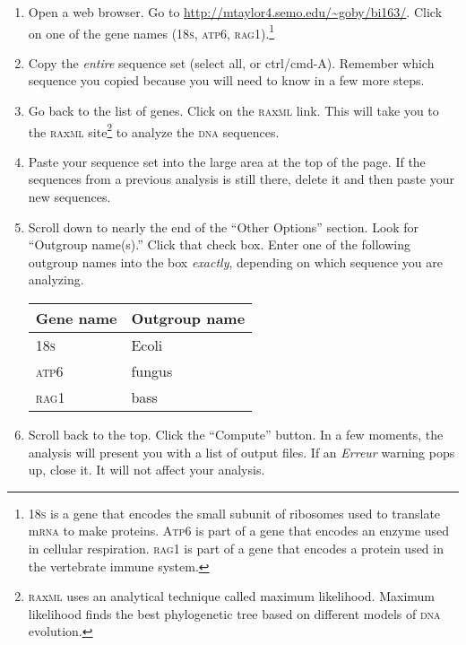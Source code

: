 \documentclass[12pt, hidelinks]{exam}
\newcommand{\dna}{\textsc{dna}}
\begin{document}
\begin{enumerate}

	\item Open a web browser. Go to \url{http://mtaylor4.semo.edu/~goby/bi163/}. Click on one of the gene names (18\textsc{s}, \textsc{atp}6, \textsc{rag}1).\footnote{18\textsc{s} is a gene that encodes the small subunit of ribosomes used to translate m\textsc{rna} to make proteins. A\textsc{tp}6 is part of a gene that encodes an enzyme used in cellular respiration. \textsc{rag}1 is part of a gene that encodes a protein used in the vertebrate immune system.} 
	
	\item Copy the \emph{entire} sequence set (select all, or ctrl/cmd-A). Remember which sequence you copied because you will need to know in a few more steps.
	
	\item Go back to the list of genes. Click on the \textsc{ra}x\textsc{ml} link. This will take you to the \textsc{ra}x\textsc{ml} site\footnote{\textsc{ra}x\textsc{ml} uses an analytical technique called maximum likelihood. Maximum likelihood finds the best phylogenetic tree based on different models of \dna{} evolution.} to analyze the \dna{} sequences. 
	
	\item Paste your sequence set into the large area at the top of the page. If the sequences from a previous analysis is still there, delete it and then paste your new sequences.
	
	\item Scroll down to nearly the end of the ``Other Options'' section. Look for ``Outgroup name(s).'' Click that check box. Enter  one of the following outgroup names into the box \emph{exactly}, depending on which sequence you are analyzing. 
	
		\begin{tabular}{@{}ll@{}}
		\toprule
		Gene name &	Outgroup name\\
		\midrule
		18\textsc{s}	&  Ecoli\\
		\textsc{atp}6	& fungus\\
		\textsc{rag}1	& bass\\
		\bottomrule		
		\end{tabular}
	
	\item Scroll back to the top. Click the ``Compute'' button. In a few moments, the analysis will present you with a list of output files. If an \emph{Erreur} warning pops up, close it. It will not affect your analysis.
	

\end{enumerate}
\end{document}

